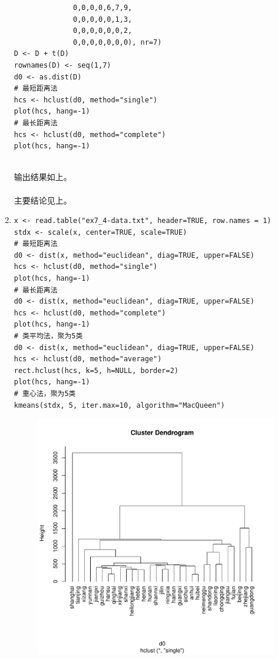 \begin{enumerate}
\begin{lstlisting}
              0,0,0,0,6,7,9,
              0,0,0,0,0,1,3,
              0,0,0,0,0,0,2,
              0,0,0,0,0,0,0), nr=7)
D <- D + t(D)
rownames(D) <- seq(1,7)
d0 <- as.dist(D)
# 最短距离法
hcs <- hclust(d0, method="single")
plot(hcs, hang=-1)
# 最长距离法
hcs <- hclust(d0, method="complete")
plot(hcs, hang=-1)
\end{lstlisting}
        \out\\
        输出结果如上。\\
        \summary\\
        主要结论见上。
        \item
        \code
\begin{lstlisting}
x <- read.table("ex7_4-data.txt", header=TRUE, row.names = 1)
stdx <- scale(x, center=TRUE, scale=TRUE)
# 最短距离法
d0 <- dist(x, method="euclidean", diag=TRUE, upper=FALSE)
hcs <- hclust(d0, method="single")
plot(hcs, hang=-1)
# 最长距离法
d0 <- dist(x, method="euclidean", diag=TRUE, upper=FALSE)
hcs <- hclust(d0, method="complete")
plot(hcs, hang=-1)
# 类平均法，聚为5类
d0 <- dist(x, method="euclidean", diag=TRUE, upper=FALSE)
hcs <- hclust(d0, method="average")
rect.hclust(hcs, k=5, h=NULL, border=2)
plot(hcs, hang=-1)
# 重心法，聚为5类
kmeans(stdx, 5, iter.max=10, algorithm="MacQueen")
\end{lstlisting}
        \out
        \begin{figure}[H]
            \centering
            \includegraphics[scale=0.5]{7.4最短距离法.pdf}

\end{figure}
\end{enumerate}
